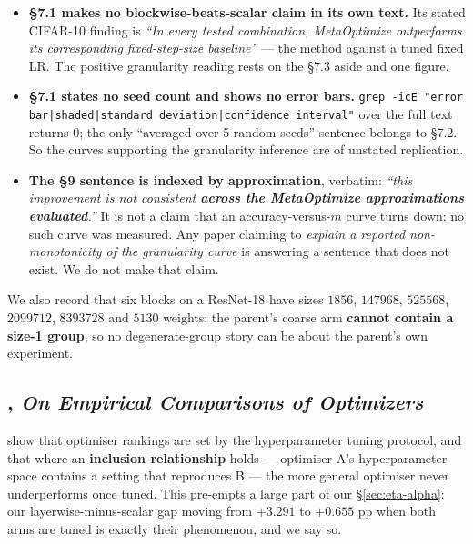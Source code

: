 \documentclass[10pt,letterpaper]{article}
\begin{document}
\begin{itemize}
\item \textbf{\S7.1 makes no blockwise-beats-scalar claim in its own text.} Its stated CIFAR-10
  finding is \emph{``In every tested combination, MetaOptimize outperforms its corresponding
  fixed-step-size baseline''} --- the method against a tuned fixed LR. The positive granularity
  reading rests on the \S7.3 aside and one figure.
\item \textbf{\S7.1 states no seed count and shows no error bars.}
  \texttt{grep -icE "error bar|shaded|standard deviation|confidence interval"} over the full
  text returns 0; the only ``averaged over 5 random seeds'' sentence belongs to \S7.2. So the
  curves supporting the granularity inference are of unstated replication.
\item \textbf{The \S9 sentence is indexed by approximation}, verbatim: \emph{``this improvement
  is not consistent \textbf{across the MetaOptimize approximations evaluated}.''} It is not a
  claim that an accuracy-versus-$m$ curve turns down; no such curve was measured. Any paper
  claiming to \emph{explain a reported non-monotonicity of the granularity curve} is answering
  a sentence that does not exist. We do not make that claim.
\end{itemize}

We also record that six blocks on a ResNet-18 \citep{he2016resnet} have sizes
$1856$, $147968$, $525568$, $2099712$, $8393728$ and $5130$ weights: the parent's coarse arm
\textbf{cannot contain a size-1 group}, so no degenerate-group story can be about the parent's
own experiment.

\subsection{\citet{choi2020empirical}, \emph{On Empirical Comparisons of Optimizers}}
\label{sec:rw-choi}

\citet{choi2020empirical} show that optimiser rankings are set by the hyperparameter tuning
protocol, and that where an \textbf{inclusion relationship} holds --- optimiser A's
hyperparameter space contains a setting that reproduces B --- the more general optimiser never
underperforms once tuned. This pre-empts a large part of our \S\ref{sec:eta-alpha}: our
layerwise-minus-scalar gap moving from $+3.291$ to $+0.655$ pp when both arms are tuned is
exactly their phenomenon, and we say so.
\end{document}
